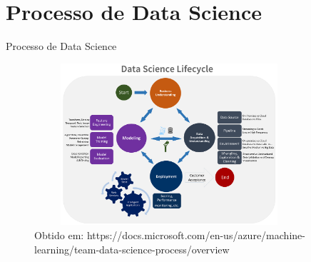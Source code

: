 \section{Processo de Data Science}

\begin{frame}	
	\begin{block}{Processo de Data Science}	
		\begin{figure}[!htb]
			\centering	  				
			\includegraphics[height=6cm, width = 10cm]{./pic/dsprocess.png}
			\caption{Obtido em: https://docs.microsoft.com/en-us/azure/machine-learning/team-data-science-process/overview}
			\label{fig_ds_process}
		\end{figure}	
	\end{block}
\end{frame}

